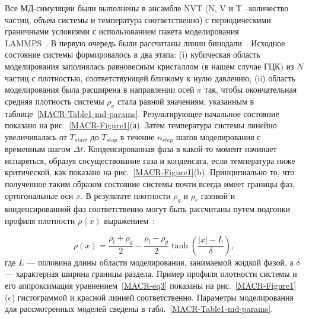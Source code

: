 Все МД-симуляции были выполнены в ансамбле NVT (N, V и T --количество частиц, объем системы и температура соответственно) с периодическими граничными условиями с использованием пакета моделирования \\  LAMMPS~\cite{10.1006/jcph.1995.1039}.
В первую очередь были рассчитаны линии бинодали~\cite{10.1021/jp806127j, 10.1021/jp1117213}.
Исходное состояние системы формировалось в два этапа: (i) кубическая область моделирования заполнялась равновесным кристаллом (в нашем случае ГЦК) из $N$ частиц с плотностью, соответствующей близкому к нулю давлению;
(ii) область моделирования была расширена в направлении осей $x$ так, чтобы окончательная средняя плотность системы $\rho_a$ стала равной значениям, указанным в таблице~\ref{MACR-Table1-md-params}.
Результирующее начальное состояние показано на рис.~\ref{MACR-Figure1}(а).
Затем температура системы линейно увеличивалась от $T_{start}$ до $T_{stop}$ в течение $n_{step}$ шагов моделирования с временным шагом $\Delta t$.
Конденсированная фаза в какой-то момент начинает испаряться, образуя сосуществование газа и конденсата, если температура ниже критической, как показано на рис.~\ref{MACR-Figure1}(b).
Принципиально то, что полученное таким образом состояние системы почти всегда имеет границы фаз, ортогональные оси $x$.
В результате плотности $\rho_g$ и $\rho_c$ газовой и конденсированной фаз соответственно могут быть рассчитаны путем подгонки профиля плотности $\rho(x)$ выражением~\cite{10.1021/jp806127j, 10.1021/jp1117213}:

\begin{equation}
  \rho(x)=\frac{\rho_{l}+\rho_{g}}{2}-\frac{\rho_{l}-\rho_{g}}{2} \tanh \left(\frac{|x|-L}{\delta}\right),
  \label{MACR-eq3}
\end{equation}
где $L$ — половина длины области моделирования, занимаемой жидкой фазой, а $\delta$ — характерная ширина границы раздела.
Пример профиля плотности системы и его аппроксимация уравнением~\eqref{MACR-eq3} показаны на рис.~\ref{MACR-Figure1}(c) гистограммой и красной линией соответственно.
Параметры моделирования для рассмотренных моделей сведены в табл.~\ref{MACR-Table1-md-params}.

